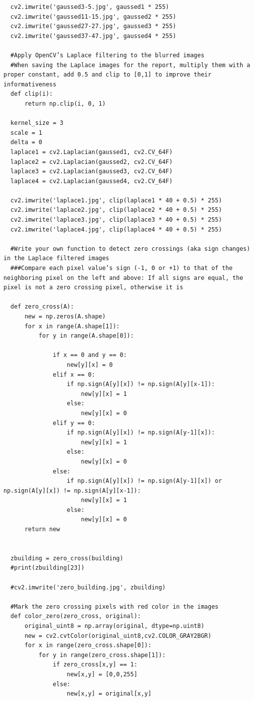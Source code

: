 \documentclass{article}
\begin{document}
\begin{verbatim}
  cv2.imwrite('gaussed3-5.jpg', gaussed1 * 255)
  cv2.imwrite('gaussed11-15.jpg', gaussed2 * 255)
  cv2.imwrite('gaussed27-27.jpg', gaussed3 * 255)
  cv2.imwrite('gaussed37-47.jpg', gaussed4 * 255)

  #Apply OpenCV’s Laplace filtering to the blurred images
  #When saving the Laplace images for the report, multiply them with a proper constant, add 0.5 and clip to [0,1] to improve their informativeness
  def clip(i):
      return np.clip(i, 0, 1)

  kernel_size = 3
  scale = 1
  delta = 0
  laplace1 = cv2.Laplacian(gaussed1, cv2.CV_64F)
  laplace2 = cv2.Laplacian(gaussed2, cv2.CV_64F)
  laplace3 = cv2.Laplacian(gaussed3, cv2.CV_64F)
  laplace4 = cv2.Laplacian(gaussed4, cv2.CV_64F)

  cv2.imwrite('laplace1.jpg', clip(laplace1 * 40 + 0.5) * 255)
  cv2.imwrite('laplace2.jpg', clip(laplace2 * 40 + 0.5) * 255)
  cv2.imwrite('laplace3.jpg', clip(laplace3 * 40 + 0.5) * 255)
  cv2.imwrite('laplace4.jpg', clip(laplace4 * 40 + 0.5) * 255)

  #Write your own function to detect zero crossings (aka sign changes) in the Laplace filtered images
  ###Compare each pixel value’s sign (-1, 0 or +1) to that of the neighboring pixel on the left and above: If all signs are equal, the pixel is not a zero crossing pixel, otherwise it is

  def zero_cross(A):
      new = np.zeros(A.shape)
      for x in range(A.shape[1]):
          for y in range(A.shape[0]):

              if x == 0 and y == 0: 
                  new[y][x] = 0
              elif x == 0:
                  if np.sign(A[y][x]) != np.sign(A[y][x-1]):
                      new[y][x] = 1
                  else:
                      new[y][x] = 0 
              elif y == 0:
                  if np.sign(A[y][x]) != np.sign(A[y-1][x]):
                      new[y][x] = 1
                  else:
                      new[y][x] = 0 
              else:
                  if np.sign(A[y][x]) != np.sign(A[y-1][x]) or np.sign(A[y][x]) != np.sign(A[y][x-1]):
                      new[y][x] = 1
                  else:
                      new[y][x] = 0
      return new


  zbuilding = zero_cross(building)
  #print(zbuilding[23])

  #cv2.imwrite('zero_building.jpg', zbuilding)

  #Mark the zero crossing pixels with red color in the images
  def color_zero(zero_cross, original):
      original_uint8 = np.array(original, dtype=np.uint8)
      new = cv2.cvtColor(original_uint8,cv2.COLOR_GRAY2BGR)
      for x in range(zero_cross.shape[0]):
          for y in range(zero_cross.shape[1]):
              if zero_cross[x,y] == 1:
                  new[x,y] = [0,0,255]
              else:
                  new[x,y] = original[x,y]
      

\end{verbatim}
\end{document}
